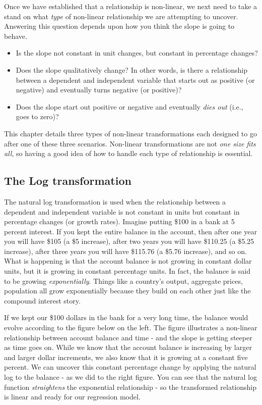\documentclass[
]{book}
\begin{document}
Once we have established that a relationship is non-linear, we next need to take a stand on what \emph{type} of non-linear relationship we are attempting to uncover. Answering this question depends upon how you think the slope is going to behave.

\begin{itemize}
\item
  Is the slope not constant in unit changes, but constant in percentage changes?
\item
  Does the slope qualitatively change? In other words, is there a relationship between a dependent and independent variable that starts out as positive (or negative) and eventually turns negative (or positive)?
\item
  Does the slope start out positive or negative and eventually \emph{dies out} (i.e., goes to zero)?
\end{itemize}

This chapter details three types of non-linear transformations each designed to go after one of these three scenarios. Non-linear transformations are not \emph{one size fits all}, so having a good idea of how to handle each type of relationship is essential.

\hypertarget{the-log-transformation}{%
\subsection{The Log transformation}\label{the-log-transformation}}

The natural log transformation is used when the relationship between a dependent and independent variable is not constant in units but constant in percentage changes (or growth rates). Imagine putting \$100 in a bank at 5 percent interest. If you kept the entire balance in the account, then after one year you will have \$105 (a \$5 increase), after two years you will have \$110.25 (a \$5.25 increase), after three years you will have \$115.76 (a \$5.76 increase), and so on. What is happening is that the account balance is not growing in constant dollar units, but it is growing in constant percentage units. In fact, the balance is said to be growing \emph{exponentially}. Things like a country's output, aggregate prices, population all grow exponentially because they build on each other just like the compound interest story.

If we kept our \$100 dollars in the bank for a very long time, the balance would evolve according to the figure below on the left. The figure illustrates a non-linear relationship between account balance and time - and the slope is getting steeper as time goes on. While we know that the account balance is increasing by larger and larger dollar increments, we also know that it is growing at a constant five percent. We can uncover this constant percentage change by applying the natural log to the balance - as we did to the right figure. You can see that the natural log function \emph{straightens} the exponential relationship - so the transformed relationship is linear and ready for our regression model.
\end{document}
